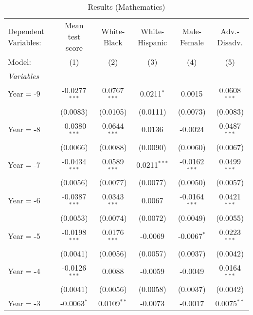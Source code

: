 
\begin{table}[htbp]
   \centering
   \caption{\label{MainResultsMath} Results (Mathematics)}
   \begin{tabular}{lccccc}
      \tabularnewline\midrule\midrule
      Dependent Variables: & Mean test score & White-Black            & White-Hispanic & Male-Female     & Adv.-Disadv.\\
      Model:               & (1)             & (2)                    & (3)            & (4)             & (5)\\
      \midrule \emph{Variables} &   &   &   &   &  \\
      Year$=$-9            & -0.0277$^{***}$ & 0.0767$^{***}$         & 0.0211$^{*}$   & 0.0015          & 0.0608$^{***}$\\
                           & (0.0083)        & (0.0105)               & (0.0111)       & (0.0073)        & (0.0083)\\
      Year$=$-8            & -0.0380$^{***}$ & 0.0644$^{***}$         & 0.0136         & -0.0024         & 0.0487$^{***}$\\
                           & (0.0066)        & (0.0088)               & (0.0090)       & (0.0060)        & (0.0067)\\
      Year$=$-7            & -0.0434$^{***}$ & 0.0589$^{***}$         & 0.0211$^{***}$ & -0.0162$^{***}$ & 0.0499$^{***}$\\
                           & (0.0056)        & (0.0077)               & (0.0077)       & (0.0050)        & (0.0057)\\
      Year$=$-6            & -0.0387$^{***}$ & 0.0343$^{***}$         & 0.0067         & -0.0164$^{***}$ & 0.0421$^{***}$\\
                           & (0.0053)        & (0.0074)               & (0.0072)       & (0.0049)        & (0.0055)\\
      Year$=$-5            & -0.0198$^{***}$ & 0.0176$^{***}$         & -0.0069        & -0.0067$^{*}$   & 0.0223$^{***}$\\
                           & (0.0041)        & (0.0056)               & (0.0057)       & (0.0037)        & (0.0042)\\
      Year$=$-4            & -0.0126$^{***}$ & 0.0088                 & -0.0059        & -0.0049         & 0.0164$^{***}$\\
                           & (0.0041)        & (0.0056)               & (0.0058)       & (0.0037)        & (0.0042)\\
      Year$=$-3            & -0.0063$^{*}$   & 0.0109$^{**}$          & -0.0073        & -0.0017         & 0.0075$^{**}$\\

\end{tabular}
\end{table}
